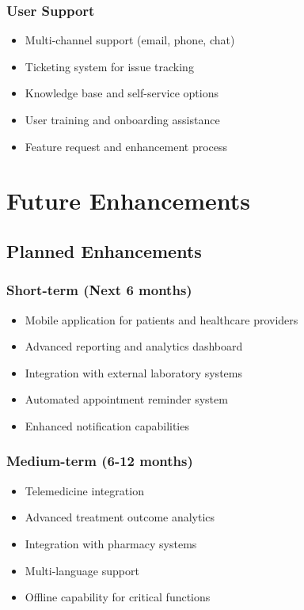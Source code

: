\documentclass[12pt,a4paper]{article}
\begin{document}
\subsubsection{User Support}
\begin{itemize}
    \item Multi-channel support (email, phone, chat)
    \item Ticketing system for issue tracking
    \item Knowledge base and self-service options
    \item User training and onboarding assistance
    \item Feature request and enhancement process
\end{itemize}

\section{Future Enhancements}

\subsection{Planned Enhancements}

\subsubsection{Short-term (Next 6 months)}
\begin{itemize}
    \item Mobile application for patients and healthcare providers
    \item Advanced reporting and analytics dashboard
    \item Integration with external laboratory systems
    \item Automated appointment reminder system
    \item Enhanced notification capabilities
\end{itemize}

\subsubsection{Medium-term (6-12 months)}
\begin{itemize}
    \item Telemedicine integration
    \item Advanced treatment outcome analytics
    \item Integration with pharmacy systems
    \item Multi-language support
    \item Offline capability for critical functions
\end{itemize}
\end{document}
